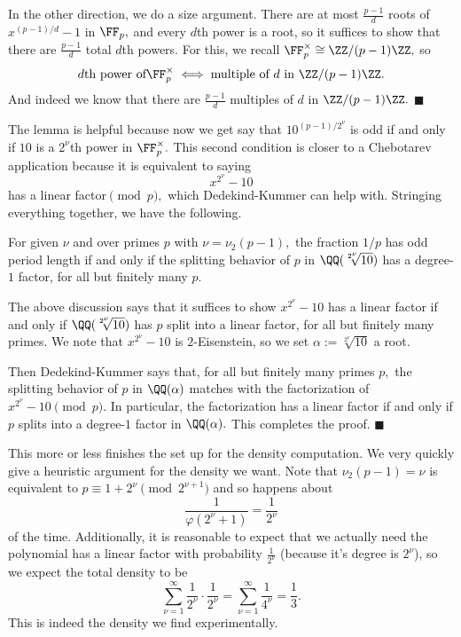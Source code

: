 In the other direction, we do a size argument. There are at most $\frac{p-1}d$ roots of $x^{(p-1)/d}-1$ in $\FF_p,$ and every $d$th power is a root, so it suffices to show that there are $\frac{p-1}d$ total $d$th powers. For this, we recall $\FF_p^\times\cong\ZZ/(p-1)\ZZ,$ so
\[d\text{th power of}\FF_p^\times\iff\text{multiple of }d\text{ in }\ZZ/(p-1)\ZZ.\]
And indeed we know that there are $\frac{p-1}d$ multiples of $d$ in $\ZZ/(p-1)\ZZ.$ $\blacksquare$

The lemma is helpful because now we get say that $10^{(p-1)/2^\nu}$ is odd if and only if $10$ is a $2^\nu$th power in $\FF_p^\times.$ This second condition is closer to a Chebotarev application because it is equivalent to saying
\[x^{2^\nu}-10\]
has a linear factor$\pmod p,$ which Dedekind-Kummer can help with. Stringing everything together, we have the following.
\begin{proposition}
    For given $\nu$ and over primes $p$ with $\nu=\nu_2(p-1),$ the fraction $1/p$ has odd period length if and only if the splitting behavior of $p$ in $\QQ(\sqrt[2^\nu]{10})$ has a degree-$1$ factor, for all but finitely many $p.$
\end{proposition}
The above discussion says that it suffices to show $x^{2^\nu}-10$ has a linear factor if and only if $\QQ(\sqrt[2^\nu]{10})$ has $p$ split into a linear factor, for all but finitely many primes. We note that $x^{2^\nu}-10$ is $2$-Eisenstein, so we set $\alpha:=\sqrt[2^\nu]{10}$ a root.

Then Dedekind-Kummer says that, for all but finitely many primes $p,$ the splitting behavior of $p$ in $\QQ(\alpha)$ matches with the factorization of $x^{2^\nu}-10\pmod p.$ In particular, the factorization has a linear factor if and only if $p$ splits into a degree-$1$ factor in $\QQ(\alpha).$ This completes the proof. $\blacksquare$

This more or less finishes the set up for the density computation. We very quickly give a heuristic argument for the density we want. Note that $\nu_2(p-1)=\nu$ is equivalent to $p\equiv1+2^\nu\pmod{2^{\nu+1}}$ and so happens about
\[\frac1{\varphi\left(2^\nu+1\right)}=\frac1{2^\nu}\]
of the time. Additionally, it is reasonable to expect that we actually need the polynomial has a linear factor with probability $\frac1{2^\nu}$ (because it's degree is $2^\nu$), so we expect the total density to be
\[\sum_{\nu=1}^\infty\frac1{2^\nu}\cdot\frac1{2^\nu}=\sum_{\nu=1}^\infty\frac1{4^\nu}=\frac13.\]
This is indeed the density we find experimentally.

